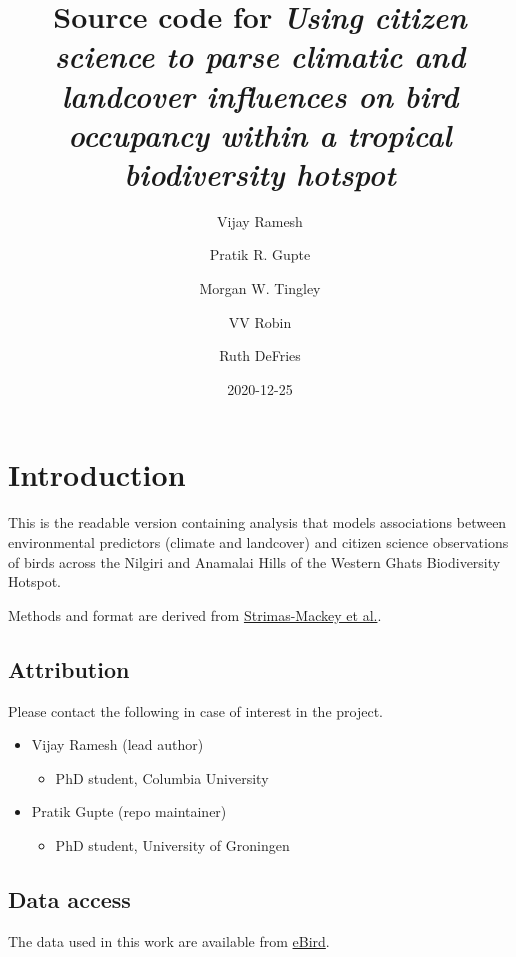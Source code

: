 \documentclass[]{article}
\title{Source code for \emph{Using citizen science to parse climatic and landcover influences on bird occupancy within a tropical biodiversity hotspot}}
\author{Vijay Ramesh \and Pratik R. Gupte \and Morgan W. Tingley \and VV Robin \and Ruth DeFries}
\date{2020-12-25}
\providecommand{\tightlist}{%
  \setlength{\itemsep}{0pt}\setlength{\parskip}{0pt}}
\begin{document}
\maketitle

{
\setcounter{tocdepth}{2}
\tableofcontents
}
\hypertarget{introduction}{%
\section{Introduction}\label{introduction}}

This is the readable version containing analysis that models associations between environmental predictors (climate and landcover) and citizen science observations of birds across the Nilgiri and Anamalai Hills of the Western Ghats Biodiversity Hotspot.

Methods and format are derived from \href{https://cornelllabofornithology.github.io/ebird-best-practices/}{Strimas-Mackey et al.}.

\hypertarget{attribution}{%
\subsection{Attribution}\label{attribution}}

Please contact the following in case of interest in the project.

\begin{itemize}
\tightlist
\item
  Vijay Ramesh (lead author)

  \begin{itemize}
  \tightlist
  \item
    PhD student, Columbia University
  \end{itemize}
\item
  Pratik Gupte (repo maintainer)

  \begin{itemize}
  \tightlist
  \item
    PhD student, University of Groningen
  \end{itemize}
\end{itemize}

\hypertarget{data-access}{%
\subsection{Data access}\label{data-access}}

The data used in this work are available from \href{http://ebird.org/data/download}{eBird}.
\end{document}
